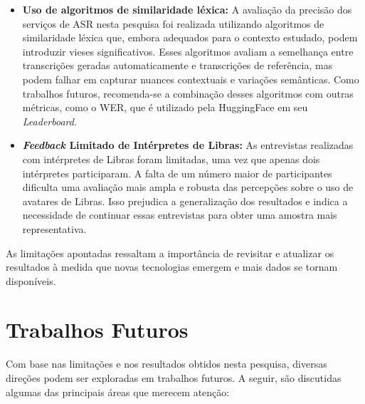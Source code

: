 \begin{itemize}
\item \textbf{Uso de algoritmos de similaridade léxica:} A avaliação da precisão dos serviços de ASR nesta pesquisa foi realizada utilizando algoritmos de similaridade léxica que, embora adequados para o contexto estudado, podem introduzir vieses significativos. Esses algoritmos avaliam a semelhança entre transcrições geradas automaticamente e transcrições de referência, mas podem falhar em capturar nuances contextuais e variações semânticas. Como trabalhos futuros, recomenda-se a combinação desses algoritmos com outras métricas, como o WER, que é utilizado pela HuggingFace em seu \textit{Leaderboard}.

\item \textbf{\textit{Feedback} Limitado de Intérpretes de Libras:} As entrevistas realizadas com intérpretes de Libras foram limitadas, uma vez que apenas dois intérpretes participaram. A falta de um número maior de participantes dificulta uma avaliação mais ampla e robusta das percepções sobre o uso de avatares de Libras. Isso prejudica a generalização dos resultados e indica a necessidade de continuar essas entrevistas para obter uma amostra mais representativa.

\end{itemize}

As limitações apontadas ressaltam a importância de revisitar e atualizar os resultados à medida que novas tecnologias emergem e mais dados se tornam disponíveis.

\section{Trabalhos Futuros}

Com base nas limitações e nos resultados obtidos nesta pesquisa, diversas direções podem ser exploradas em trabalhos futuros. A seguir, são discutidas algumas das principais áreas que merecem atenção:

